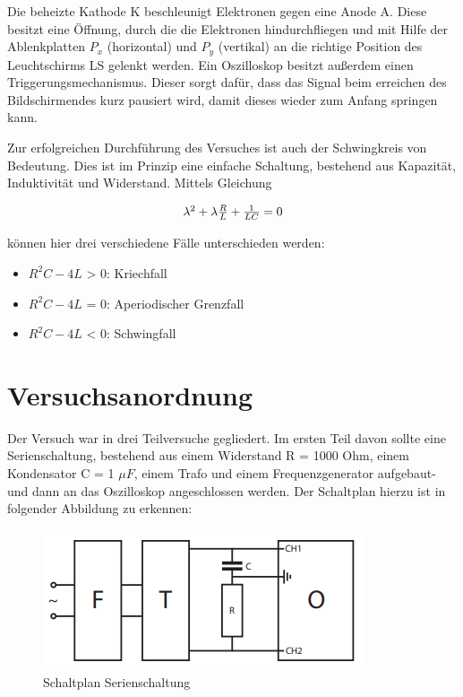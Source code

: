 \documentclass[12pt,a4paper,twoside]{article}
\begin{document}
\noindent
Die beheizte Kathode K beschleunigt Elektronen gegen eine Anode A. Diese besitzt eine Öffnung, durch die die Elektronen hindurchfliegen und mit Hilfe der Ablenkplatten $P_{x}$ (horizontal) und $P_{y}$ (vertikal) an die richtige Position des Leuchtschirms LS gelenkt werden. 
Ein Oszilloskop besitzt außerdem einen Triggerungsmechanismus. Dieser sorgt dafür, dass das Signal beim erreichen des Bildschirmendes kurz pausiert wird, damit dieses wieder zum Anfang springen kann. \newline

\noindent
Zur erfolgreichen Durchführung des Versuches ist auch der Schwingkreis von Bedeutung. Dies ist im Prinzip eine einfache Schaltung, bestehend aus Kapazität, Induktivität und Widerstand.
Mittels Gleichung

    \begin{equation}
        \label{eq:SchwingkreisGleichungFälle}
        \centerline{$\lambda^2 + \lambda \frac{R}{L} + \frac{1}{LC} = 0 $}
    \end{equation}

\noindent
können hier drei verschiedene Fälle unterschieden werden:

\begin{itemize}
    \item $R^2C - 4L$ > 0: Kriechfall
    \item $R^2C - 4L$ = 0: Aperiodischer Grenzfall
    \item $R^2C - 4L$ < 0: Schwingfall
\end{itemize}

\section{Versuchsanordnung} %

Der Versuch war in drei Teilversuche gegliedert. Im ersten Teil davon sollte eine Serienschaltung, bestehend aus einem Widerstand R = 1000 Ohm, einem Kondensator C = 1 $\mu F$, einem Trafo und einem Frequenzgenerator aufgebaut- und dann an das Oszilloskop angeschlossen werden.
Der Schaltplan hierzu ist in folgender Abbildung zu erkennen:

\begin{figure}[H]
    \centering
    \includegraphics[width=0.6\linewidth, angle=-90]{nudes/3.2 Schaltplan.png}
    \caption{Schaltplan Serienschaltung}
    \label{fig:Schaltplan Serienschaltung}
\end{figure}
\end{document}
